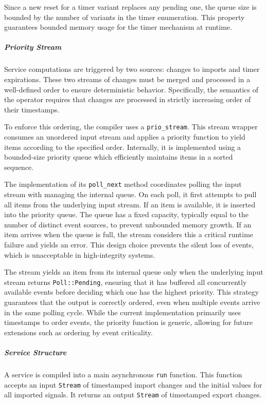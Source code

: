 Since a new reset for a timer variant replaces any pending one, the queue size is bounded by the
number of variants in the timer enumeration. This property guarantees bounded memory usage for the
timer mechanism at runtime.

\subparagraph{Priority Stream}
Service computations are triggered by two sources: changes to imports and timer expirations. These
two streams of changes must be merged and processed in a well-defined order to ensure deterministic
behavior. Specifically, the semantics of the  operator requires that changes are
processed in strictly increasing order of their timestamps.

To enforce this ordering, the compiler uses a \texttt{prio\_stream}. This stream wrapper consumes an
unordered input stream and applies a priority function to yield items according to the specified
order. Internally, it is implemented using a bounded-size priority queue which efficiently maintains
items in a sorted sequence.

The implementation of its \texttt{poll\_next} method coordinates polling the input stream with
managing the internal queue. On each poll, it first attempts to pull all items from the underlying
input stream. If an item is available, it is inserted into the priority queue. The queue has a fixed
capacity, typically equal to the number of distinct event sources, to prevent unbounded memory
growth. If an item arrives when the queue is full, the stream considers this a critical runtime
failure and yields an error. This design choice prevents the silent loss of events, which is
unacceptable in high-integrity systems.

The stream yields an item from its internal queue only when the underlying input stream returns
\texttt{Poll::Pending}, ensuring that it has buffered all concurrently available events before
deciding which one has the highest priority. This strategy guarantees that the output is correctly
ordered, even when multiple events arrive in the same polling cycle. While the current
implementation primarily uses timestamps to order events, the priority function is generic, allowing
for future extensions such as ordering by event criticality.

\subparagraph{Service Structure}
A service is compiled into a main asynchronous \texttt{run} function. This function accepts an input
\texttt{Stream} of timestamped import changes and the initial values for all imported signals. It
returns an output \texttt{Stream} of timestamped export changes.

